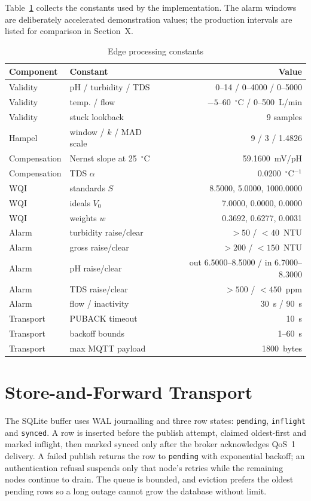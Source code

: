 \documentclass[conference]{IEEEtran}
\begin{document}
Table~\ref{tab:constants} collects the constants used by the implementation. The
alarm windows are deliberately accelerated demonstration values; the production
intervals are listed for comparison in Section~X.

\begin{table}[t]
\caption{Edge processing constants}
\label{tab:constants}
\centering
\scriptsize
\begin{tabular}{@{}llr@{}}
\toprule
Component & Constant & Value \\
\midrule
Validity & pH / turbidity / TDS & 0--14 / 0--4000 / 0--5000 \\
Validity & temp. / flow & $-5$--60~$^\circ$C / 0--500~L/min \\
Validity & stuck lookback & 9 samples \\
Hampel & window / $k$ / MAD scale & 9 / 3 / 1.4826 \\
Compensation & Nernst slope at 25~$^\circ$C & 59.1600~mV/pH \\
Compensation & TDS $\alpha$ & 0.0200~$^\circ$C$^{-1}$ \\
WQI & standards $S$ & 8.5000, 5.0000, 1000.0000 \\
WQI & ideals $V_0$ & 7.0000, 0.0000, 0.0000 \\
WQI & weights $w$ & 0.3692, 0.6277, 0.0031 \\
Alarm & turbidity raise/clear & $>50$ / $<40$~NTU \\
Alarm & gross raise/clear & $>200$ / $<150$~NTU \\
Alarm & pH raise/clear & out 6.5000--8.5000 / in 6.7000--8.3000 \\
Alarm & TDS raise/clear & $>500$ / $<450$~ppm \\
Alarm & flow / inactivity & 30~s / 90~s \\
Transport & PUBACK timeout & 10~s \\
Transport & backoff bounds & 1--60~s \\
Transport & max MQTT payload & 1800~bytes \\
\bottomrule
\end{tabular}
\end{table}

\section{Store-and-Forward Transport}
\label{sec:transport}

The SQLite buffer uses WAL journalling and three row states: \texttt{pending},
\texttt{inflight} and \texttt{synced}. A row is inserted before the publish
attempt, claimed oldest-first and marked inflight, then marked synced only after
the broker acknowledges QoS~1 delivery. A failed publish returns the row to
\texttt{pending} with exponential backoff; an authentication refusal suspends
only that node's retries while the remaining nodes continue to drain. The queue
is bounded, and eviction prefers the oldest pending rows so a long outage cannot
grow the database without limit.
\end{document}
